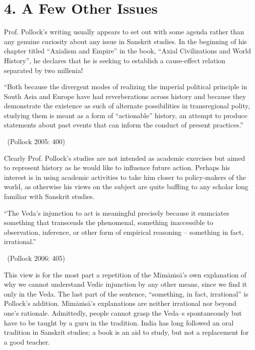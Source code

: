 \section*{4. A Few Other Issues}

Prof. Pollock’s writing usually appears to set out with some agenda rather than any genuine curiosity about any issue in Sanskrit studies. In the beginning of his chapter titled “Axialism and Empire” in the book, “Axial Civilizations and World History”, he declares that he is seeking to establish a cause-effect relation separated by two millenia!

\begin{myquote}
“Both because the divergent modes of realizing the imperial political principle in South Asia and Europe have had reverberations across history and because they demonstrate the existence as such of alternate possibilities in transregional polity, studying them is meant as a form of “actionable” history, an attempt to produce statements about past events that can inform the conduct of present practices.” 

~\hfill (Pollock 2005: 400)
\end{myquote}

Clearly Prof. Pollock’s studies are not intended as academic exercises but aimed to represent history as he would like to influence future action. Perhaps his interest is in using academic activities to take him closer to policy-makers of the world, as otherwise his views on the subject are quite baffling to any scholar long familiar with Sanskrit studies.

\begin{myquote}
“The Veda’s injunction to act is meaningful precisely because it enunciates something that transcends the phenomenal, something inaccessible to observation, inference, or other form of empirical reasoning -- something in fact, irrational.” 

~\hfill (Pollock 2006: 405)
\end{myquote}

This view is for the most part a repetition of the Mīmāṁsā’s own explanation of why we cannot understand Vedic injunction by any other means, since we find it only in the Veda. The last part of the sentence, “something, in fact, irrational” is Pollock’s addition. Mīmāṁsā’s explanations are neither irrational nor beyond one’s rationale. Admittedly, people cannot grasp the Veda--s spontaneously but have to be taught by a guru in the tradition. India has long followed an oral tradition in Sanskrit studies; a book is an aid to study, but not a replacement for a good teacher. 

